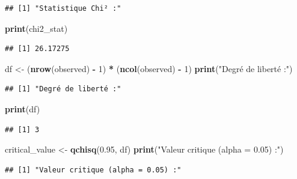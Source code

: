 \documentclass[
]{article}
\newenvironment{Shaded}{\begin{snugshade}}{\end{snugshade}}
\newcommand{\DecValTok}[1]{\textcolor[rgb]{0.00,0.00,0.81}{#1}}
\newcommand{\FloatTok}[1]{\textcolor[rgb]{0.00,0.00,0.81}{#1}}
\newcommand{\FunctionTok}[1]{\textcolor[rgb]{0.13,0.29,0.53}{\textbf{#1}}}
\newcommand{\NormalTok}[1]{#1}
\newcommand{\OtherTok}[1]{\textcolor[rgb]{0.56,0.35,0.01}{#1}}
\newcommand{\SpecialCharTok}[1]{\textcolor[rgb]{0.81,0.36,0.00}{\textbf{#1}}}
\newcommand{\StringTok}[1]{\textcolor[rgb]{0.31,0.60,0.02}{#1}}
\begin{document}
\begin{verbatim}
## [1] "Statistique Chi² :"
\end{verbatim}

\begin{Shaded}
\begin{Highlighting}[]
\FunctionTok{print}\NormalTok{(chi2\_stat)}
\end{Highlighting}
\end{Shaded}

\begin{verbatim}
## [1] 26.17275
\end{verbatim}

\begin{Shaded}
\begin{Highlighting}[]
\NormalTok{df }\OtherTok{\textless{}{-}}\NormalTok{ (}\FunctionTok{nrow}\NormalTok{(observed) }\SpecialCharTok{{-}} \DecValTok{1}\NormalTok{) }\SpecialCharTok{*}\NormalTok{ (}\FunctionTok{ncol}\NormalTok{(observed) }\SpecialCharTok{{-}} \DecValTok{1}\NormalTok{)}
\FunctionTok{print}\NormalTok{(}\StringTok{"Degré de liberté :"}\NormalTok{)}
\end{Highlighting}
\end{Shaded}

\begin{verbatim}
## [1] "Degré de liberté :"
\end{verbatim}

\begin{Shaded}
\begin{Highlighting}[]
\FunctionTok{print}\NormalTok{(df)}
\end{Highlighting}
\end{Shaded}

\begin{verbatim}
## [1] 3
\end{verbatim}

\begin{Shaded}
\begin{Highlighting}[]
\NormalTok{critical\_value }\OtherTok{\textless{}{-}} \FunctionTok{qchisq}\NormalTok{(}\FloatTok{0.95}\NormalTok{, df)}
\FunctionTok{print}\NormalTok{(}\StringTok{"Valeur critique (alpha = 0.05) :"}\NormalTok{)}
\end{Highlighting}
\end{Shaded}

\begin{verbatim}
## [1] "Valeur critique (alpha = 0.05) :"
\end{verbatim}
\end{document}
